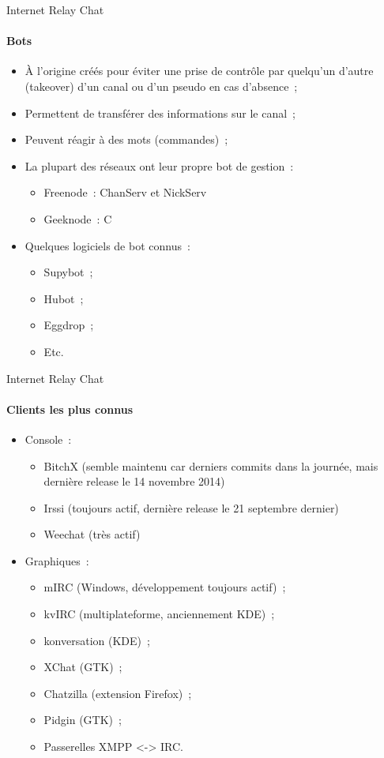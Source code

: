 \begin{frame}{Internet Relay Chat}
\framesubtitle{Bots}
\begin{itemize}
  \item À l'origine créés pour éviter une prise de contrôle par quelqu'un d'autre (takeover) d'un canal ou d'un pseudo en cas d'absence~;
  \pause
  \item Permettent de transférer des informations sur le canal~;
  \pause
  \item Peuvent réagir à des mots (commandes)~;
  \pause
  \item La plupart des réseaux ont leur propre bot de gestion~:
  \begin{itemize}
   \pause
   \item Freenode~: ChanServ et NickServ
   \pause
   \item Geeknode~: C
  \end{itemize}

  \pause
  \item Quelques logiciels de bot connus~:
  \begin{itemize}
   \pause
   \item Supybot~;
   \pause
   \item Hubot~;
   \pause
   \item Eggdrop~;
   \pause
   \item Etc.
  \end{itemize}
 \end{itemize}
\end{frame}
 
\begin{frame}{Internet Relay Chat}
\framesubtitle{Clients les plus connus}
\begin{itemize}
 \item Console~:
 \begin{itemize}
  \item BitchX (semble maintenu car derniers commits dans la journée, mais dernière release le 14 novembre 2014)
  \pause
  \item Irssi (toujours actif, dernière release le 21 septembre dernier)
  \pause
  \item Weechat (très actif)
 \end{itemize}
 \pause
 \item Graphiques~:
 \begin{itemize}
  \item mIRC (Windows, développement toujours actif)~;
  \pause
  \item kvIRC (multiplateforme, anciennement KDE)~;
  \pause
  \item konversation (KDE)~;
  \pause
  \item XChat (GTK)~;
  \pause
  \item Chatzilla (extension Firefox)~;
  \pause
  \item Pidgin (GTK)~;
  \pause
  \item Passerelles XMPP <-> IRC.
 \end{itemize}
\end{itemize}
\end{frame}

